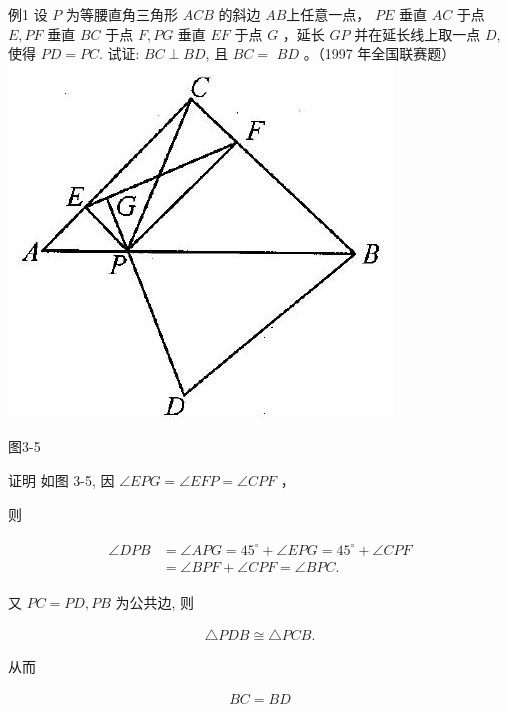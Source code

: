 \documentclass[10pt]{article}
\begin{document}
例1 设 $P$ 为等腰直角三角形 $A C B$ 的斜边 $A B$上任意一点， $P E$ 垂直 $A C$ 于点 $E, P F$ 垂直 $B C$ 于点 $F, P G$ 垂直 $E F$ 于点 $G$ ，延长 $G P$ 并在延长线上取一点 $D$, 使得 $P D=P C$. 试证: $B C \perp B D$, 且 $B C=$ $B D$ 。（1997 年全国联赛题）\\
\includegraphics[max width=\textwidth, center]{2024_10_30_2c8f45efd4a519b08e1ag-026(1)}

图3-5

证明 如图 3-5, 因 $\angle E P G=\angle E F P=\angle C P F$ ，

则

\begin{align*}
\begin{aligned}
\angle D P B & =\angle A P G=45^{\circ}+\angle E P G=45^{\circ}+\angle C P F \\
& =\angle B P F+\angle C P F=\angle B P C .
\end{aligned}
\end{align*}

又 $P C=P D, P B$ 为公共边, 则

\begin{align*}
\triangle P D B \cong \triangle P C B .
\end{align*}

从而

\begin{align*}
B C=B D
\end{align*}
\end{document}
